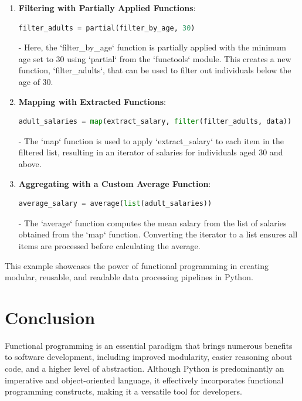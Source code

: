 \documentclass[a4paper]{article}
\begin{document}
\begin{enumerate}
    \item \textbf{Filtering with Partially Applied Functions}:
    \begin{lstlisting}[language=Python]
    filter_adults = partial(filter_by_age, 30)
\end{lstlisting}
    - Here, the `filter\_by\_age` function is partially applied with the minimum age set to 30 using `partial` from the `functools` module. This creates a new function, `filter\_adults`, that can be used to filter out individuals below the age of 30.

    \item \textbf{Mapping with Extracted Functions}:
    \begin{lstlisting}[language=Python]
    adult_salaries = map(extract_salary, filter(filter_adults, data))
\end{lstlisting}
    - The `map` function is used to apply `extract\_salary` to each item in the filtered list, resulting in an iterator of salaries for individuals aged 30 and above.

    \item \textbf{Aggregating with a Custom Average Function}:
    \begin{lstlisting}[language=Python]
    average_salary = average(list(adult_salaries))
\end{lstlisting}
    - The `average` function computes the mean salary from the list of salaries obtained from the `map` function. Converting the iterator to a list ensures all items are processed before calculating the average.

\end{enumerate}

This example showcases the power of functional programming in creating modular, reusable, and readable data processing pipelines in Python.

\newpage
\section{Conclusion}
Functional programming is an essential paradigm that brings numerous benefits to software development, including improved modularity, easier reasoning about code, and a higher level of abstraction. Although Python is predominantly an imperative and object-oriented language, it effectively incorporates functional programming constructs, making it a versatile tool for developers.\\
\end{document}
